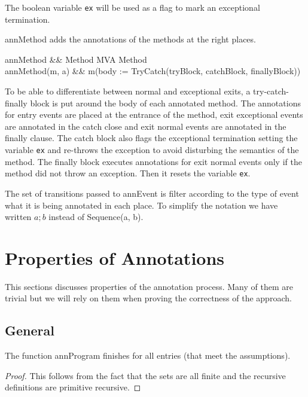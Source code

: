 \documentclass[a4paper,10pt]{article}
\begin{document}
The boolean variable \texttt{ex} will be used as a flag to mark an exceptional termination.

\<annMethod\> adds the annotations of the methods at the right places.
\begin{haskell}
annMethod &\ofType& Method \times MVA \to Method\\
annMethod(m, a) &\eqdef& m(body := TryCatch(tryBlock, catchBlock, finallyBlock))
\end{haskell}
To be able to differentiate between normal and exceptional exits, a try-catch-finally block is put around the
body of each annotated method.
The annotations for entry events are placed at the entrance of the method, exit exceptional events are
annotated in the catch close and exit normal events are annotated in the finally clause. The catch block also
flags the exceptional termination setting the variable \texttt{ex} and re-throws the exception to avoid
disturbing the semantics of the method.
The finally block executes annotations for exit normal events only if the method did not throw an exception.
Then it resets the variable \texttt{ex}.

The set of transitions passed to \<annEvent\> is filter according to the type of event what it is being
annotated in each place.
To simplify the notation we have written $a; b$ instead of \<Sequence(a, b)\>.


\section{Properties of Annotations}
This sections discusses properties of the annotation process. Many of them are trivial but we will rely on
them when proving the correctness of the approach.

\subsection{General}
\begin{property}
  The function \<annProgram\> finishes for all entries (that meet the assumptions).
\begin{proof}
  This follows from the fact that the sets are all finite and the recursive definitions are primitive
recursive.
\end{proof}
\end{property}
\end{document}
